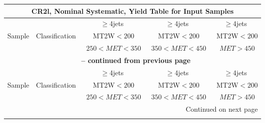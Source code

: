 \documentclass{article}
\begin{document}
 
 
 
 
\pagebreak 

 
 
 
 
\begin{longtable}{|l|c|c|c|c|} 
 
\multicolumn{5}{c}{ CR2l, Nominal Systematic, Yield Table for Input Samples }\\* \hline 
 &  & $\ge$4jets  & $\ge$4jets  & $\ge$4jets \\* 
Sample & Classification  & ~MT2W$<200$  & ~MT2W$<200$  & ~MT2W$<200$ \\* 
 &  & ~$250<MET<350$  & ~$350<MET<450$  & ~$MET>450$ \\* 
\hline \hline 
\endfirsthead 
 
\multicolumn{5}{c}{{\bfseries \tablename\ \thetable{} -- continued from previous page}}\\* \hline 
 &  & $\ge$4jets  & $\ge$4jets  & $\ge$4jets \\* 
Sample & Classification  & ~MT2W$<200$  & ~MT2W$<200$  & ~MT2W$<200$ \\* 
 &  & ~$250<MET<350$  & ~$350<MET<450$  & ~$MET>450$ \\* 
\hline \hline 
\endhead 
 
\multicolumn{5}{|r|}{{Continued on next page}}\\* \hline 
\endfoot 
 
 
\endlastfoot 
 

\end{longtable}
\end{document}

